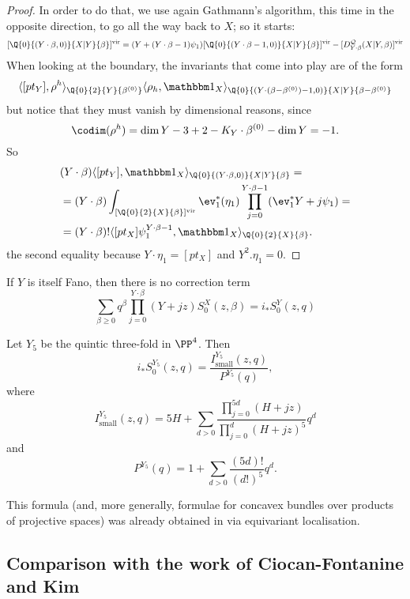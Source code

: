 \begin{proof}
In order to do that, we use again Gathmann's algorithm, this time in the opposite direction, to go all the way back to $X$; so it starts:
\[
 [\Q{0}{(Y \cdot \beta,0)}{X|Y}{\beta}]^\text{vir}=(Y+(Y\cdot\beta-1)\psi_1)[\Q{0}{(Y\cdot\beta-1,0)}{X|Y}{\beta}]^\text{vir}-[D_{Y\cdot\beta}^{\mathcal Q}(X|Y,\beta)]^\text{vir}
\]
When looking at the boundary, the invariants that come into play are of the form
\[
 \langle [pt_Y],\rho^h\rangle_{\Q{0}{2}{Y}{\beta^{(0)}}}\langle \rho_h,\mathbbm 1_{X}\rangle_{\Q{0}{(Y\cdot(\beta-\beta^{(0)})-1,0)}{X|Y}{\beta-\beta^{(0)}}}
\]
but notice that they must vanish by dimensional reasons, since
\[
 \codim(\rho^h)=\dim Y-3+2-K_Y\cdot\beta^{(0)}-\dim Y=-1.
\]
So
\begin{align*}
 & (Y\cdot\beta)\langle [pt_Y],\mathbbm 1_{X}\rangle_{\Q{0}{(Y\cdot\beta,0)}{X|Y}{\beta}} = \\
 & = (Y\cdot\beta)\int_{[\Q{0}{2}{X}{\beta}]^{\text{vir}}}\ev_1^*(\eta_1)\prod_{j=0}^{Y\cdot\beta-1}(\ev_1^*Y+j\psi_1) = \\
 & = (Y\cdot\beta)!\langle[pt_X]\psi_1^{Y\cdot\beta-1},\mathbbm 1_X\rangle_{\Q{0}{2}{X}{\beta}}.
\end{align*}
the second equality because $Y\cdot\eta_1=[pt_X]$ and $Y^2.\eta_1=0$.
\end{proof}

\begin{cor}
 If $Y$ is itself Fano, then there is no correction term
 \[
  \sum_{\beta\geq 0} q^\beta\prod_{j=0}^{Y\cdot\beta}(Y+jz)S_0^X(z,\beta) = i_*S_0^Y(z,q)
 \]
\end{cor}

\begin{cor}
 Let $Y_5$ be the quintic three-fold in $\PP^4$. Then
 \[
  i_*S_0^{Y_5}(z,q)=\frac{I_{\text{small}}^{Y_5}(z,q)}{P^{Y_5}(q)},
 \]
where
\[
 I_{\text{small}}^{Y_5}(z,q)=5H+\sum_{d>0}\frac{\prod_{j=0}^{5d}(H+jz)}{\prod_{j=0}^{d}(H+jz)^5}q^d
\]
and
\[
 P^{Y_5}(q)=1+\sum_{d>0}\frac{(5d)!}{(d!)^5}q^d.
\]
\end{cor}

\begin{remark}
 This formula (and, more generally, formulae for concavex bundles over products of projective spaces) was already obtained in \cite[Theorem 1]{CZ-mirror} via equivariant localisation.
\end{remark}

\subsection{Comparison with the work of Ciocan-Fontanine and Kim}


